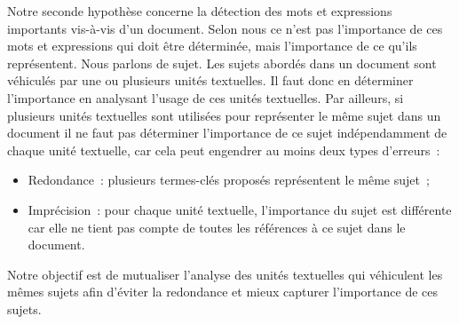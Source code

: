     Notre seconde hypothèse concerne la détection des mots et expressions
    importants vis-à-vis d'un document. Selon nous ce n'est pas l'importance de
    ces mots et expressions qui doit être déterminée, mais l'importance de ce
    qu'ils représentent. Nous parlons de sujet.
    Les sujets abordés dans un document sont véhiculés par une ou
    plusieurs unités textuelles. Il faut donc en déterminer l'importance en analysant
    l'usage de ces unités textuelles. Par ailleurs, si plusieurs unités
    textuelles sont utilisées pour représenter le même sujet dans un document il
    ne faut pas déterminer l'importance de ce sujet indépendamment de chaque
    unité textuelle, car cela peut engendrer au moins deux types d'erreurs~:
    \begin{itemize}
      \item{Redondance~: plusieurs termes-clés proposés représentent le
            même sujet~;}
      \item{Imprécision~: pour chaque unité textuelle, l'importance du sujet est
            différente car elle ne tient pas compte de toutes les références à ce
            sujet dans le document.}
    \end{itemize}
    Notre objectif est de mutualiser l'analyse des unités textuelles qui
    véhiculent les mêmes sujets afin d'éviter la redondance et mieux capturer
    l'importance de ces sujets.
    
